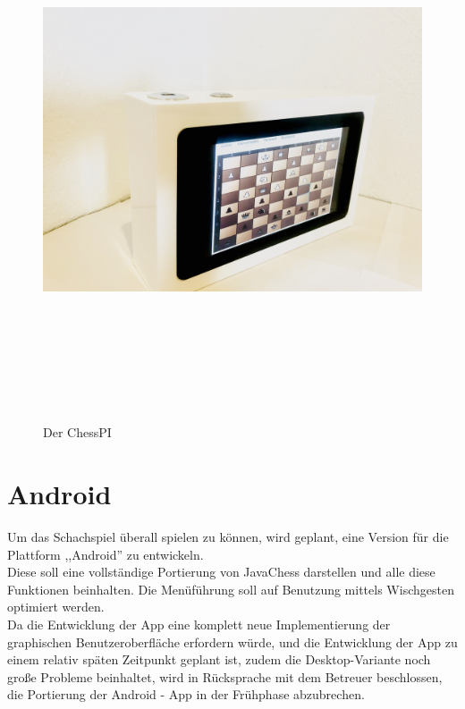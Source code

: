 \documentclass[12pt,a4paper]{article}
\begin{document}
\begin{figure}[H]
  \centering
		\includegraphics[height =  16cm, angle=90]{graphics/chesspi.jpg}
		\caption{Der ChessPI}
		\label{fig:case}
\end{figure}

\clearpage\vfill\newpage{}
\section{Android}
\label{SEC:android}

Um das Schachspiel überall spielen zu können, wird geplant, eine Version für die Plattform ,,Android'' zu entwickeln. \\
Diese soll eine vollständige Portierung von JavaChess darstellen und alle diese Funktionen beinhalten. Die Menüführung soll auf Benutzung mittels Wischgesten optimiert werden.\\ [2ex]
Da die Entwicklung der App eine komplett neue Implementierung der graphischen Benutzeroberfläche erfordern würde, und die Entwicklung der App zu einem relativ späten Zeitpunkt geplant ist, zudem die Desktop-Variante noch große Probleme beinhaltet, wird in Rücksprache mit dem Betreuer beschlossen, die Portierung der Android - App in der Frühphase abzubrechen. 
\end{document}
